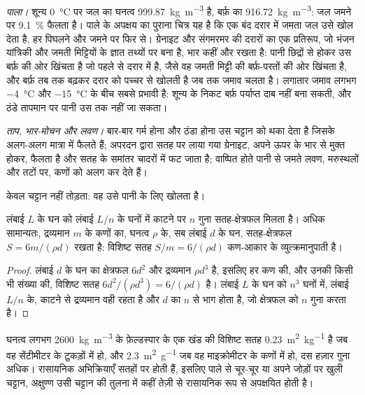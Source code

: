 \emph{पाला।} शून्य \qty{0}{\celsius} पर जल का घनत्व \qty{999.87}{kg.m^{-3}} है, बर्फ़ का \qty{916.72}{kg.m^{-3}}: जल जमने पर \qty{9.1}{\percent} फैलता है। पाले के अपक्षय का पुराना चित्र यह है कि एक बंद दरार में जमता जल उसे खोल देता है, हर पिघलने और जमने पर फिर से। ग्रेनाइट और संगमरमर की दरारों का एक प्रतिरूप, जो भंजन यांत्रिकी और जमती मिट्टियों के ज्ञात तथ्यों पर बना है, भार कहीं और रखता है: पानी छिद्रों से होकर उस बर्फ़ की ओर खिंचता है जो पहले से दरार में है, जैसे वह जमती मिट्टी की बर्फ़-परतों की ओर खिंचता है, और बर्फ़ तब तक बढ़कर दरार को पच्चर से खोलती है जब तक जमाव चलता है। लगातार जमाव लगभग \qty{-4}{\celsius} और \qty{-15}{\celsius} के बीच सबसे प्रभावी है: शून्य के निकट बर्फ़ पर्याप्त दाब नहीं बना सकती, और ठंडे तापमान पर पानी उस तक नहीं जा सकता।

\emph{ताप, भार-मोचन और लवण।} बार-बार गर्म होना और ठंडा होना उस चट्टान को थका देता है जिसके  अलग-अलग मात्रा में फैलते हैं; अपरदन द्वारा सतह पर लाया गया ग्रेनाइट, अपने ऊपर के भार से मुक्त होकर, फैलता है और सतह के समांतर चादरों में फट जाता है; वाष्पित होते पानी से जमते लवण, मरुस्थलों और तटों पर, कणों को अलग कर देते हैं।

 केवल चट्टान नहीं तोड़ता: वह उसे पानी के लिए खोलता है।

\begin{proposition}[खंडन से खुली सतह]\label{prop:b1:weathering-clays:surface}
लंबाई $L$ के घन को लंबाई $L/n$ के घनों में काटने पर $n$ गुना सतह-क्षेत्रफल मिलता है। अधिक सामान्यतः, द्रव्यमान $m$ के कणों का, घनत्व $\rho$ के, सब लंबाई $d$ के घन, सतह-क्षेत्रफल $S = 6m/(\rho d)$ रखता है: विशिष्ट सतह $S/m =
6/(\rho d)$ कण-आकार के व्युत्क्रमानुपाती है।
\end{proposition}

\begin{proof}
लंबाई $d$ के घन का क्षेत्रफल $6d^2$ और द्रव्यमान $\rho d^3$ है, इसलिए हर कण की, और उनकी किसी भी संख्या की, विशिष्ट सतह $6d^2/(\rho d^3)
= 6/(\rho d)$ है। लंबाई $L$ के घन को $n^3$ घनों में, लंबाई $L/n$ के, काटने से द्रव्यमान वही रहता है और $d$ का $n$ से भाग होता है, जो क्षेत्रफल को $n$ गुना करता है।
\end{proof}

घनत्व लगभग \qty{2600}{kg.m^{-3}} के फ़ेल्डस्पार के एक खंड की विशिष्ट सतह \qty{0.23}{m^2.kg^{-1}} है जब वह सेंटीमीटर के टुकड़ों में हो, और \qty{2.3}{m^2.g^{-1}} जब वह माइक्रोमीटर के कणों में हो, दस हज़ार गुना अधिक। रासायनिक अभिक्रियाएँ सतहों पर होती हैं, इसलिए पाले से चूर-चूर या अपने जोड़ों पर खुली चट्टान, अक्षुण्ण उसी चट्टान की तुलना में कहीं तेज़ी से रासायनिक रूप से अपक्षयित होती है।

